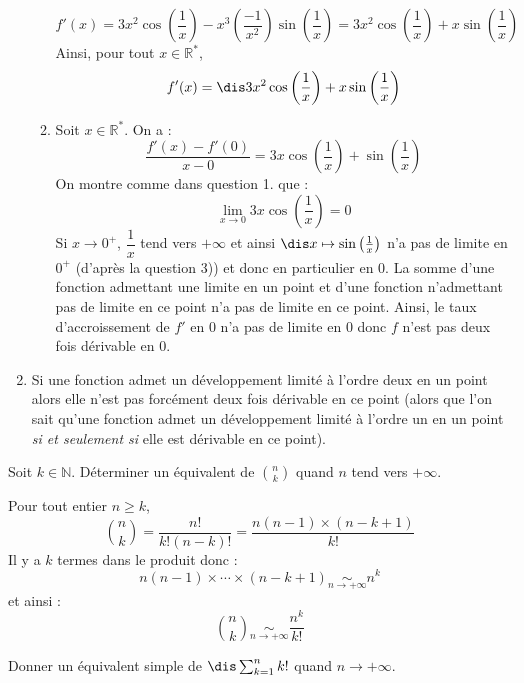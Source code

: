 \documentclass[a4paper,10pt]{report}
\begin{document}
\begin{enumerate}
\begin{enumerate}
$$ f'(x) = 3x^2 \cos \left( \frac{1}{x} \right) - x^3 \left( \frac{-1}{x^2} \right)  \sin \left( \frac{1}{x} \right) = 3x^2 \cos \left( \frac{1}{x} \right) + x  \sin \left( \frac{1}{x} \right)$$
Ainsi, pour tout $x \in \mathbb{R}^*$, 
$$f'(x) = \dis 3x^2 \cos \left( \frac{1}{x} \right) + x  \sin \left( \frac{1}{x} \right)$$
\item Soit $x \in \mathbb{R}^*$. On a :
$$ \frac{f'(x)-f'(0)}{x-0} = 3x \cos \left( \frac{1}{x} \right) +   \sin \left( \frac{1}{x} \right)$$
On montre comme dans question 1. que :
$$ \lim_{x \rightarrow 0} 3x \cos \left( \frac{1}{x} \right) = 0$$
Si $x \rightarrow 0^+$, $\dfrac{1}{x}$ tend vers $+ \infty$ et ainsi $\dis x \mapsto \sin \left( \frac{1}{x} \right)$ n'a pas de limite en $0^+$ (d'après la question 3)) et donc en particulier en $0$. La somme d'une fonction admettant une limite en un point et d'une fonction n'admettant pas de limite en ce point n'a pas de limite en ce point. Ainsi, le taux d'accroissement de $f'$ en $0$ n'a pas de limite en $0$ donc $f$ n'est pas deux fois dérivable en $0$.
\end{enumerate}
\item Si une fonction admet un développement limité à l'ordre deux en un point alors elle n'est pas forcément deux fois dérivable en ce point (alors que l'on sait qu'une fonction admet un développement limité à l'ordre un en un point \textit{si et seulement si} elle est dérivable en ce point).
\end{enumerate}

\begin{Exercice}{} Soit $k \in \mathbb{N}$. Déterminer un équivalent de $\binom{n}{k}$ quand $n$ tend vers $+ \infty$. 
\end{Exercice}

\corr Pour tout entier $n \geq k$,
$$ \binom{n}{k} = \dfrac{n!}{k!(n-k)!} = \dfrac{n(n-1)\times (n-k+1)}{k!}$$
Il y a $k$ termes dans le produit donc :
$$ n(n-1)\times \cdots \times (n-k+1) \underset{n \rightarrow + \infty}{\sim} n^k$$
et ainsi :
$$  \binom{n}{k} \underset{n \rightarrow+ \infty}{\sim} \dfrac{n^k}{k!}$$

\begin{Exercice}{} Donner un équivalent simple de $\dis \sum_{k=1}^n k!$ quand $n \rightarrow + \infty$.
\end{Exercice} 
\end{document}
